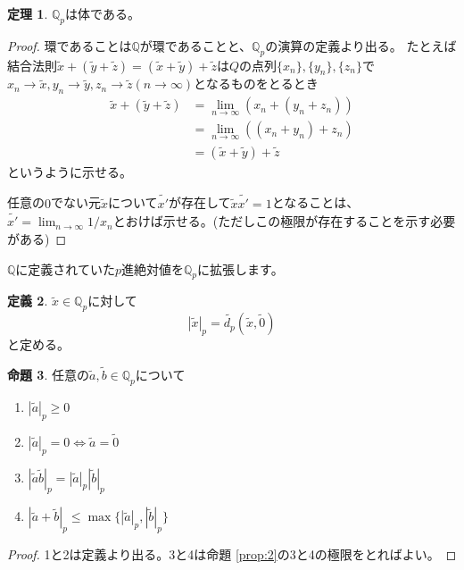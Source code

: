 \documentclass[uplatex]{jsarticle}
\newcommand{\Q}{\mathbb{Q}}
\theoremstyle{definition} %
\newtheorem{thm}{定理}
\newtheorem{defi}[thm]{定義}
\newtheorem{prop}[thm]{命題}
\begin{document}
\begin{oframed}\begin{thm}
$\Q_p$は体である。
\end{thm}\end{oframed}
\begin{proof}
環であることは$\Q$が環であることと、$\Q_p$の演算の定義より出る。
たとえば結合法則$\tilde{x} + (\tilde{y} + \tilde{z}) = (\tilde{x} + \tilde{y}) + \tilde{z}$は$Q$の点列$\{x_n\}, \{y_n\}, \{z_n\}$で$x_n \to \tilde{x}, y_n \to \tilde{y}, z_n \to \tilde{z} (n \to \infty)$となるものをとるとき
\begin{align*}
\tilde{x} + (\tilde{y} + \tilde{z}) &= \lim_{n\to\infty} (x_n + (y_n + z_n)) \\
 &= \lim_{n\to\infty} ((x_n + y_n) + z_n) \\
 &= (\tilde{x} + \tilde{y}) + \tilde{z}
\end{align*}
というように示せる。

任意の$0$でない元$\tilde{x}$について$\tilde{x'}$が存在して$\tilde{x} \tilde{x'} = 1$となることは、$\tilde{x'} = \lim_{n\to\infty}{1/x_n}$とおけば示せる。(ただしこの極限が存在することを示す必要がある)
\end{proof}

$\Q$に定義されていた$p$進絶対値を$\Q_p$に拡張します。

\begin{oframed}\begin{defi}
$\tilde{x} \in \Q_p$に対して
\[|\tilde{x}|_p = \tilde{d_p}(\tilde{x}, \tilde{0})\]
と定める。
\end{defi}\end{oframed}

\begin{oframed}\begin{prop}\label{prop:4}
任意の$\tilde{a}, \tilde{b} \in \Q_p$について
\begin{enumerate}
\item $|\tilde{a}|_p \geq 0$
\item $|\tilde{a}|_p = 0 \iff \tilde{a} = \tilde{0}$
\item $|\tilde{a}\tilde{b}|_p = |\tilde{a}|_p  |\tilde{b}|_p$
\item $|\tilde{a}+\tilde{b}|_p \leq \max\{|\tilde{a}|_p, |\tilde{b}|_p\}$
\end{enumerate}
\end{prop}\end{oframed}
\begin{proof}
1と2は定義より出る。3と4は命題 \ref{prop:2}の3と4の極限をとればよい。
\end{proof}
\end{document}

